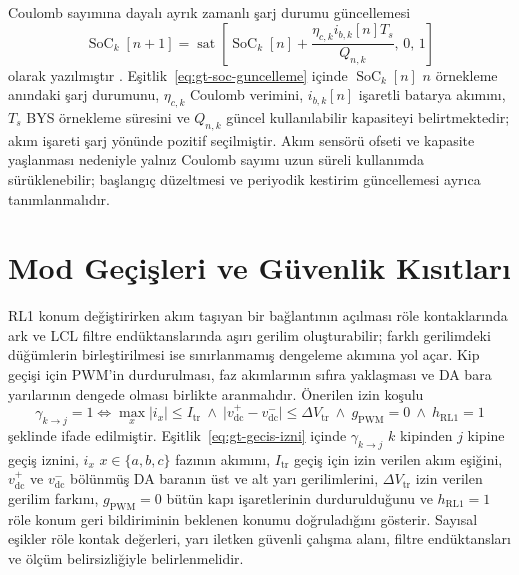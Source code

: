 Coulomb sayımına dayalı ayrık zamanlı şarj durumu güncellemesi
\begin{equation}
  \operatorname{SoC}_k[n+1]=\operatorname{sat}\!\left[
  \operatorname{SoC}_k[n]+\frac{\eta_{c,k}i_{b,k}[n]T_s}{Q_{n,k}},\,0,\,1\right]
  \label{eq:gt-soc-guncelleme}
\end{equation}
olarak yazılmıştır \citep{Plett2015}. Eşitlik~\eqref{eq:gt-soc-guncelleme} içinde $\operatorname{SoC}_k[n]$ $n$ örnekleme anındaki şarj durumunu, $\eta_{c,k}$ Coulomb verimini, $i_{b,k}[n]$ işaretli batarya akımını, $T_s$ BYS örnekleme süresini ve $Q_{n,k}$ güncel kullanılabilir kapasiteyi belirtmektedir; akım işareti şarj yönünde pozitif seçilmiştir. Akım sensörü ofseti ve kapasite yaşlanması nedeniyle yalnız Coulomb sayımı uzun süreli kullanımda sürüklenebilir; başlangıç düzeltmesi ve periyodik kestirim güncellemesi ayrıca tanımlanmalıdır.

\section{Mod Geçişleri ve Güvenlik Kısıtları}
\label{sec:gt-gecis-guvenlik}

RL1 konum değiştirirken akım taşıyan bir bağlantının açılması röle kontaklarında ark ve LCL filtre endüktanslarında aşırı gerilim oluşturabilir; farklı gerilimdeki düğümlerin birleştirilmesi ise sınırlanmamış dengeleme akımına yol açar. Kip geçişi için PWM'in durdurulması, faz akımlarının sıfıra yaklaşması ve DA bara yarılarının dengede olması birlikte aranmalıdır. Önerilen izin koşulu
\begin{equation}
  \gamma_{k\rightarrow j}=1
  \iff
  \max_{x}|i_{x}|\leq I_{\mathrm{tr}}
  \ \land\
  \bigl|v_{\mathrm{dc}}^{+}-v_{\mathrm{dc}}^{-}\bigr|\leq \Delta V_{\mathrm{tr}}
  \ \land\
  g_{\mathrm{PWM}}=0
  \ \land\
  h_{\mathrm{RL1}}=1
  \label{eq:gt-gecis-izni}
\end{equation}
şeklinde ifade edilmiştir. Eşitlik~\eqref{eq:gt-gecis-izni} içinde $\gamma_{k\rightarrow j}$ $k$ kipinden $j$ kipine geçiş iznini, $i_{x}$ $x\in\{a,b,c\}$ fazının akımını, $I_{\mathrm{tr}}$ geçiş için izin verilen akım eşiğini, $v_{\mathrm{dc}}^{+}$ ve $v_{\mathrm{dc}}^{-}$ bölünmüş DA baranın üst ve alt yarı gerilimlerini, $\Delta V_{\mathrm{tr}}$ izin verilen gerilim farkını, $g_{\mathrm{PWM}}=0$ bütün kapı işaretlerinin durdurulduğunu ve $h_{\mathrm{RL1}}=1$ röle konum geri bildiriminin beklenen konumu doğruladığını gösterir. Sayısal eşikler röle kontak değerleri, yarı iletken güvenli çalışma alanı, filtre endüktansları ve ölçüm belirsizliğiyle belirlenmelidir.

